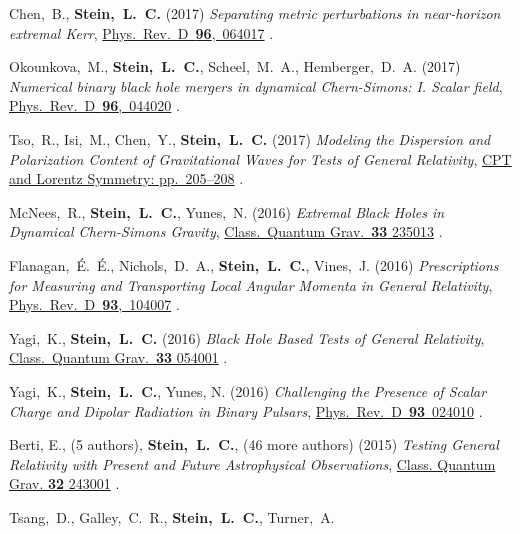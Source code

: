 \begin{etaremune}[start=\value{pubCounter}]
  Chen,~B., {\bf Stein,~L.~C.}
  (2017)
  {\it Separating metric perturbations in near-horizon extremal Kerr},
  \href{https://doi.org/10.1103/PhysRevD.96.064017}{Phys.~Rev.~D~{\bf 96},~064017}
  .
\item
  Okounkova,~M.,
  {\bf Stein,~L.~C.},
  Scheel,~M.~A.,
  Hemberger,~D.~A.
  (2017)
  {\it Numerical binary black hole mergers in dynamical Chern-Simons:
    I. Scalar field},
  \href{https://doi.org/10.1103/PhysRevD.96.044020}{Phys.~Rev.~D~{\bf 96},~044020}
  .
\item
  Tso,~R., Isi,~M., Chen,~Y., {\bf Stein,~L.~C.}
  (2017)
  {\it Modeling the Dispersion and Polarization Content of
    Gravitational Waves for Tests of General Relativity},
  \href{http://dx.doi.org/10.1142/9789813148505_0052}{CPT and Lorentz Symmetry: pp.~205--208}
  .
\item
  McNees,~R., {\bf Stein,~L.~C.}, Yunes,~N.
  (2016)
  {\it Extremal Black Holes in Dynamical Chern-Simons Gravity},
  \href{http://dx.doi.org/10.1088/0264-9381/33/23/235013}{Class.~Quantum Grav.~{\bf 33} 235013}
  .
\item
  Flanagan,~\'E.~\'E., Nichols,~D.~A., {\bf Stein,~L.~C.}, Vines,~J.
  (2016)
  {\it Prescriptions for Measuring and Transporting Local Angular
    Momenta in General Relativity},
  \href{http://dx.doi.org/10.1103/PhysRevD.93.104007}{Phys.~Rev.~D~{\bf 93},~104007}
  .
\item
  Yagi,~K., {\bf Stein,~L.~C.}
  (2016)
  {\it Black Hole Based Tests of General Relativity},
  \href{http://dx.doi.org/10.1088/0264-9381/33/5/054001}{Class.~Quantum Grav.~{\bf 33} 054001}
  .
\item
  Yagi,~K., {\bf Stein,~L.~C.}, Yunes, N.
  (2016)
  {\it Challenging the Presence of Scalar Charge and Dipolar Radiation
    in Binary Pulsars},
  \href{http://dx.doi.org/doi:10.1103/PhysRevD.93.024010}{Phys.~Rev.~D~{\bf 93}~024010}
  .
\item
  Berti, E., (5 authors), {\bf Stein,~L.~C.}, (46 more authors)
  (2015)
  {\it Testing General Relativity with Present and Future
    Astrophysical Observations},
  \href{http://dx.doi.org/10.1088/0264-9381/32/24/243001}{Class. Quantum Grav. {\bf 32} 243001}
  .
\item
  Tsang,~D., Galley,~C.~R., {\bf Stein,~L.~C.}, Turner,~A.

\end{etaremune}
